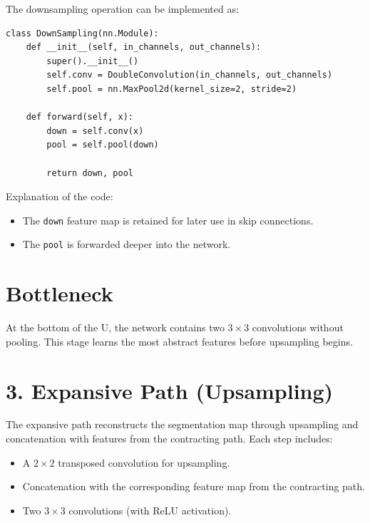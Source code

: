 \documentclass{article}
\begin{document}
The downsampling operation can be implemented as:

\begin{verbatim}
class DownSampling(nn.Module):
    def __init__(self, in_channels, out_channels):
        super().__init__()
        self.conv = DoubleConvolution(in_channels, out_channels)
        self.pool = nn.MaxPool2d(kernel_size=2, stride=2)
    
    def forward(self, x):
        down = self.conv(x)
        pool = self.pool(down)

        return down, pool
\end{verbatim}

Explanation of the code:

\begin{itemize}
    \item The \texttt{down} feature map is retained for later use in skip connections.
    \item The \texttt{pool} is forwarded deeper into the network.
\end{itemize}











\section{Bottleneck}

At the bottom of the U, the network contains two $3 \times 3$ convolutions without pooling. This stage learns the most abstract features before upsampling begins.

\section*{3. Expansive Path (Upsampling)}

The expansive path reconstructs the segmentation map through upsampling and concatenation with features from the contracting path. Each step includes:
\begin{itemize}
    \item A $2 \times 2$ transposed convolution for upsampling.
    \item Concatenation with the corresponding feature map from the contracting path.
    \item Two $3 \times 3$ convolutions (with ReLU activation).
\end{itemize}
\end{document}
